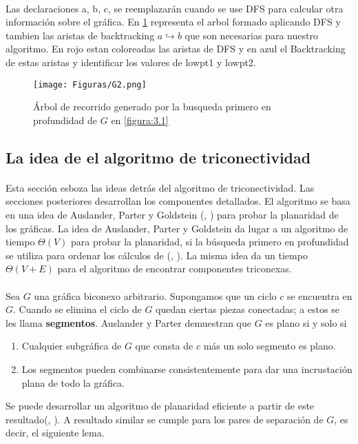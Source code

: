 \paragraph{}
Las declaraciones a, b, c, se reemplazarán cuando se use DFS para calcular otra información sobre el gráfica. En \ref{figura:3.3} representa el arbol formado aplicando DFS y tambien las aristas de backtracking $a \hookrightarrow b$ que son necesarias para nuestro algoritmo. En rojo estan coloreadas las aristas de DFS y en azul el Backtracking de estas aristas y identificar los valores de lowpt1 y lowpt2.

\begin{figure}[H]
\centering
\texttt{[image: Figuras/G2.png]}
\caption{Árbol de recorrido generado por la busqueda primero en profundidad de $G$ en \ref{figura:3.1}}
\label{figura:3.3}
\end{figure}

\subsection{La idea de el algoritmo de triconectividad}

\paragraph{}
Esta sección esboza las ideas detrás del algoritmo de triconectividad. Las secciones posteriores desarrollan los componentes detallados. El algoritmo se basa en una idea de Auslander, Parter y Goldstein (\citep{auslander-1961}, \citep{goldstein1963efficient}) para probar la planaridad de los gráficas. La idea de Auslander, Parter y Goldstein da lugar a un algoritmo de tiempo $\Theta\left(V\right)$ para probar la planaridad, si la búsqueda primero en profundidad se utiliza para ordenar los cálculos de (\citep{efalgm}, \citep{ept}). La misma idea da un tiempo $\Theta\left(V + E\right)$ para el algoritmo de encontrar componentes triconexas.

\paragraph{}
Sea $G$ una gráfica biconexo arbitrario. Supongamos que un ciclo $c$ se encuentra en $G$. Cuando se elimina el ciclo de $G$ quedan ciertas piezas conectadas; a estos se les llama \textbf{segmentos}. Auslander y Parter \citep{auslander-1961} demuestran que $G$ es plano si y solo si
\begin{enumerate}
\item Cualquier subgráfica de $G$ que consta de $c$ más un solo segmento es plano.
\item Los segmentos pueden combinarse consistentemente para dar una incrustación plana de todo la gráfica.
\end{enumerate}
Se puede desarrollar un algoritmo de planaridad eficiente a partir de este resultado(\citep{efalgm}, \citep{ept}). A resultado similar se cumple para los pares de separación de $G$, es decir, el siguiente lema.

